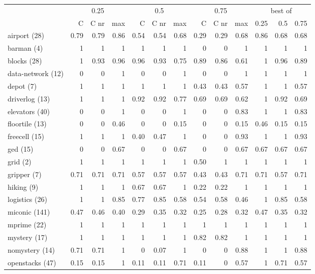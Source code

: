 	\scriptsize
	\begin{tabular}{l|rrr|rrr|rrr|rrr}
		& \multicolumn{3}{c}{0.25} & \multicolumn{3}{|c}{0.5} & \multicolumn{3}{|c}{0.75} & \multicolumn{3}{|c}{best of}\\
		& C & C nr & max & C & C nr & max & C & C nr & max  & 0.25 & 0.5 & 0.75 \\\hline
		airport (28) & 0.79 & 0.79 & 0.86 & 0.54 & 0.54 & 0.68 & 0.29 & 0.29 & 0.68 & 0.86 & 0.68 & 0.68\\
		barman (4) & 1 & 1 & 1 & 1 & 1 & 1 & 0 & 0 & 1 & 1 & 1 & 1\\
		blocks (28) & 1 & 0.93 & 0.96 & 0.96 & 0.93 & 0.75 & 0.89 & 0.86 & 0.61 & 1 & 0.96 & 0.89\\
		data-network (12) & 0 & 0 & 1 & 0 & 0 & 1 & 0 & 0 & 1 & 1 & 1 & 1\\
		depot (7) & 1 & 1 & 1 & 1 & 1 & 1 & 0.43 & 0.43 & 0.57 & 1 & 1 & 0.57\\
		driverlog (13) & 1 & 1 & 1 & 0.92 & 0.92 & 0.77 & 0.69 & 0.69 & 0.62 & 1 & 0.92 & 0.69\\
		elevators (40) & 0 & 0 & 1 & 0 & 0 & 1 & 0 & 0 & 0.83 & 1 & 1 & 0.83\\
		floortile (13) & 0 & 0 & 0.46 & 0 & 0 & 0.15 & 0 & 0 & 0.15 & 0.46 & 0.15 & 0.15\\
		freecell (15) & 1 & 1 & 1 & 0.40 & 0.47 & 1 & 0 & 0 & 0.93 & 1 & 1 & 0.93\\
		ged (15) & 0 & 0 & 0.67 & 0 & 0 & 0.67 & 0 & 0 & 0.67 & 0.67 & 0.67 & 0.67\\
		grid (2) & 1 & 1 & 1 & 1 & 1 & 1 & 0.50 & 1 & 1 & 1 & 1 & 1\\
		gripper (7) & 0.71 & 0.71 & 0.71 & 0.57 & 0.57 & 0.57 & 0.43 & 0.43 & 0.71 & 0.71 & 0.57 & 0.71\\
		hiking (9) & 1 & 1 & 1 & 0.67 & 0.67 & 1 & 0.22 & 0.22 & 1 & 1 & 1 & 1\\
		logistics (26) & 1 & 1 & 0.85 & 0.77 & 0.85 & 0.58 & 0.54 & 0.58 & 0.46 & 1 & 0.85 & 0.58\\
		miconic (141) & 0.47 & 0.46 & 0.40 & 0.29 & 0.35 & 0.32 & 0.25 & 0.28 & 0.32 & 0.47 & 0.35 & 0.32\\
		mprime (22) & 1 & 1 & 1 & 1 & 1 & 1 & 1 & 1 & 1 & 1 & 1 & 1\\
		mystery (17) & 1 & 1 & 1 & 1 & 1 & 1 & 0.82 & 0.82 & 1 & 1 & 1 & 1\\
		nomystery (14) & 0.71 & 0.71 & 1 & 0 & 0.07 & 1 & 0 & 0 & 0.88 & 1 & 1 & 0.88\\
		openstacks (47) & 0.15 & 0.15 & 1 & 0.11 & 0.11 & 0.71 & 0.11 & 0 & 0.57 & 1 & 0.71 & 0.57\\

\end{tabular}
